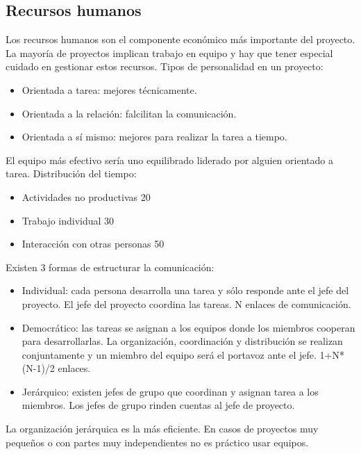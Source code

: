 \documentclass{article}
\begin{document}
\subsection{Recursos humanos}
Los recursos humanos son el componente económico más importante del proyecto. La mayoría de proyectos implican trabajo en equipo y hay que tener especial cuidado en gestionar estos recursos.
Tipos de personalidad en un proyecto:
\begin{itemize}
	\item Orientada a tarea: mejores técnicamente.
	\item Orientada a la relación: falcilitan la comunicación.
	\item Orientada a sí mismo: mejores para realizar la tarea a tiempo.
\end{itemize}
El equipo más efectivo sería uno equilibrado liderado por alguien orientado a tarea.
Distribución del tiempo:
\begin{itemize}
	\item Actividades no productivas 20%
	\item Trabajo individual 30%
	\item Interacción con otras personas 50%
\end{itemize}
Existen 3 formas de estructurar la comunicación:
\begin{itemize}
	\item Individual: cada persona desarrolla una tarea y sólo responde ante el jefe del proyecto. El jefe del proyecto coordina las tareas. N enlaces de comunicación.
	\item Democrático: las tareas se asignan a los equipos donde los miembros cooperan para desarrollarlas. La organización, coordinación y distribución se realizan conjuntamente y un miembro del equipo será el portavoz ante el jefe. 1+N*(N-1)/2 enlaces.
	\item Jerárquico: existen jefes de grupo que coordinan y asignan tarea a los miembros. Los jefes de grupo rinden cuentas al jefe de proyecto. 
\end{itemize}
La organización jerárquica es la más eficiente. En casos de proyectos muy pequeños o con partes muy independientes no es práctico usar equipos. \\
\end{document}
